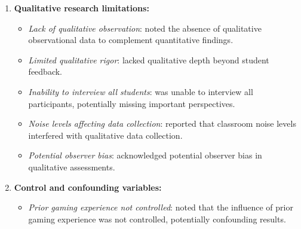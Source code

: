 \documentclass[a4paper,fleqn]{cas-sc}
\begin{document}
\begin{enumerate}[noitemsep]
\begin{itemize}[noitemsep]
 \item \textit{Single institution studies}: \citet{32Cheng20241718, 34Serrano2023, 36Scholz2021, 42Huffer201581, 60Hoy2018, 64Hsu201324, 73Wolfartsberger2011160} were conducted at single institutions, limiting ecological validity.
 
 \item \textit{Limited comparative analysis}: \citet{51Ardito2007, 65Razak201139} lacked quantitative assessment methods and formal comparative analysis.
 
 \item \textit{No implementation or testing phase}: \citet{17Manzanares2019, 18Shih201054, 20Erandaru2014, 38Mercik2024} were theoretical or design papers without empirical validation.
\end{itemize}

	\item 
\textbf{Qualitative research limitations:}

\begin{itemize}[noitemsep]
 \item \textit{Lack of qualitative observation}: \citet{11Ternblad2023115} noted the absence of qualitative observational data to complement quantitative findings.
 
 \item \textit{Limited qualitative rigor}: \citet{60Hoy2018} lacked qualitative depth beyond student feedback.
 
 \item \textit{Inability to interview all students}: \citet{3Watson2011466} was unable to interview all participants, potentially missing important perspectives.
 
 \item \textit{Noise levels affecting data collection}: \citet{3Watson2011466} reported that classroom noise levels interfered with qualitative data collection.
 
 \item \textit{Potential observer bias}: \citet{64Hsu201324} acknowledged potential observer bias in qualitative assessments.
\end{itemize}

	\item 
\textbf{Control and confounding variables:}

\begin{itemize}[noitemsep]
 \item \textit{Prior gaming experience not controlled}: \citet{8Yu2014, 56Akkerman2009449} noted that the influence of prior gaming experience was not controlled, potentially confounding results.
 

\end{itemize}
\end{enumerate}
\end{document}
